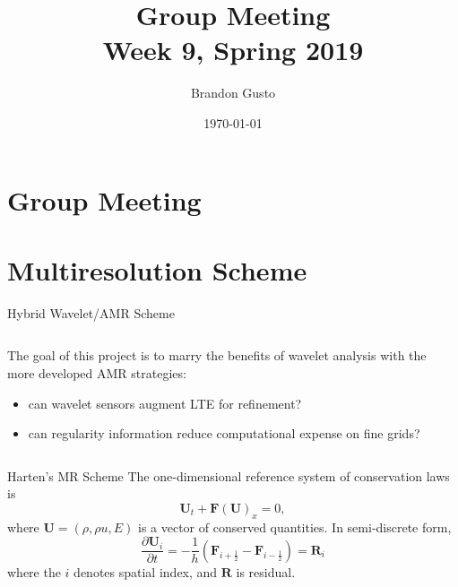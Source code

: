 \documentclass{beamer}
\newcommand{\weeknum}{9}
\begin{document}
\section{Group Meeting}
\title{Group Meeting \\ Week \weeknum, Spring 2019}
\author{Brandon Gusto} %
\date{\today}
\frame{\titlepage}

\section{Multiresolution Scheme}

\begin{frame}{Hybrid Wavelet/AMR Scheme}
    \begin{columns}
        \begin{column}{0.58\textwidth}
            The goal of this project is to marry the benefits of wavelet analysis with the more developed AMR strategies:
            \begin{itemize}
                \item can wavelet sensors augment LTE for refinement?
                \item can regularity information reduce computational expense on fine grids?
            \end{itemize}
        \end{column}
        \begin{column}{0.44\textwidth}
            \scalebox{0.4}{
                
            }
        \end{column}
    \end{columns}
\end{frame}

\begin{frame}{Harten's MR Scheme}
    The one-dimensional reference system of conservation laws is
    \begin{equation*}
        \mathbf{U}_{t} + \mathbf{F}(\mathbf{U})_{x} = 0,
    \end{equation*}
    where $\mathbf{U} = (\rho,\rho u,E)$ is a vector of conserved quantities.
    In semi-discrete form,
    \begin{equation*}
        \frac{\partial \mathbf{U}_{i}}{\partial t} = -\frac{1}{h} \left( \mathbf{F}_{i+\frac{1}{2}}
            - \mathbf{F}_{i-\frac{1}{2}} \right) = \mathbf{R}_{i}
    \end{equation*}
    where the $i$ denotes spatial index, and $\mathbf{R}$ is residual.
\end{frame}
\end{document}
